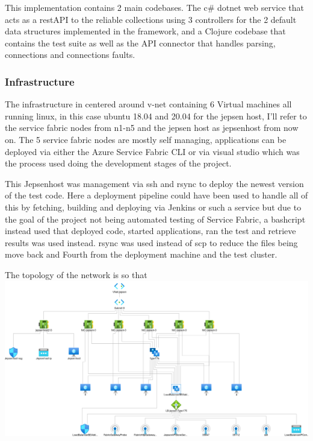 \documentclass[a4paper,10pt,titlepage]{report}
\begin{document}
    This implementation contains 2 main codebases. The c\# dotnet web service that acts as a restAPI to the reliable collections using 3 controllers for the 2 default data structures implemented in the framework, and a Clojure codebase that contains the test suite as well as the API connector that handles parsing, connections and connections faults.

    \subsubsection{Infrastructure}
    The infrastructure in centered around v-net containing 6 Virtual machines all running linux, in this case ubuntu 18.04 and 20.04 for the jepsen host, I'll refer to the service fabric nodes from n1-n5 and the jepsen host as jepsenhost from now on.
    The 5 service fabric nodes are mostly self managing, applications can be deployed via either the Azure Service Fabric CLI\cite{https://docs.microsoft.com/en-us/azure/service-fabric/service-fabric-cli} or via visual studio\cite{https://docs.microsoft.com/en-us/azure/service-fabric/service-fabric-tutorial-deploy-app-to-party-cluster} which was the process used doing the development stages of the project.

    This Jepsenhost was management via ssh and rsync to deploy the newest version of the test code. Here a deployment pipeline could have been used to handle all of this by fetching, building and deploying via Jenkins or such a service but due to the goal of the project not being automated testing of Service Fabric, a bashcript instead used that deployed code, started applications, ran the test and retrieve results was used instead. rsync was used instead of scp to reduce the files being move back and Fourth from the deployment machine and the test cluster.

    The topology of the network is so that \\
    \includegraphics[scale=0.3]{images/topology.png}
\end{document}
